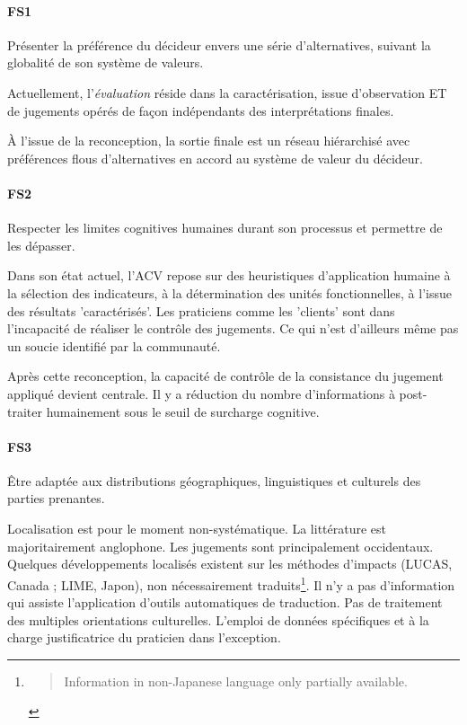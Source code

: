 \paragraph{FS1} 
Présenter la préférence du décideur envers une série d'alternatives, suivant la globalité de son système de valeurs.

Actuellement, l'\textit{évaluation} réside dans la caractérisation, issue d'observation ET de jugements opérés de façon indépendants des interprétations finales.

À l'issue de la reconception, la sortie finale est un réseau hiérarchisé avec préférences flous d'alternatives en accord au système de valeur du décideur.

\paragraph{FS2} 
Respecter les limites cognitives humaines durant son processus et permettre de les dépasser.

Dans son état actuel, l'ACV repose sur des heuristiques d'application humaine à la sélection des indicateurs, à la détermination des unités fonctionnelles, à l'issue des résultats 'caractérisés'.
Les praticiens comme les 'clients' sont dans l'incapacité de réaliser le contrôle des jugements.
Ce qui n'est d'ailleurs même pas un soucie identifié par la communauté.

Après cette reconception, la capacité de contrôle de la consistance du jugement appliqué devient centrale.
Il y a réduction du nombre d'informations à post-traiter humainement sous le seuil de surcharge cognitive.

 
\paragraph{FS3} 
Être adaptée aux distributions géographiques, linguistiques et culturels des parties prenantes.

Localisation est pour le moment non-systématique.
La littérature est majoritairement anglophone.
Les jugements sont principalement occidentaux.
Quelques développements localisés existent sur les méthodes d'impacts (LUCAS, Canada ; LIME, Japon), non nécessairement traduits\footnote{\blockcquote{jrc_ilcd_2011}{ Information in non-Japanese language only partially available.}}.
Il n'y a pas d'information qui assiste l'application d'outils automatiques de traduction.
Pas de traitement des multiples orientations culturelles.
L'emploi de données spécifiques et à la charge justificatrice du praticien dans l'exception.


